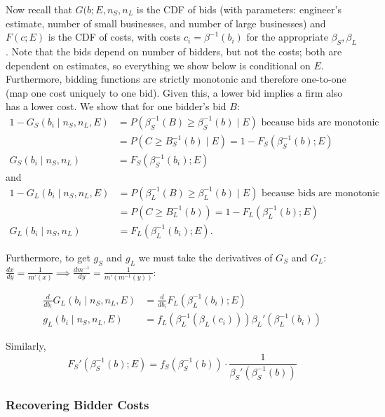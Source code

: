 Now recall that \(G(b; E, n_S, n_L\) is the CDF of bids (with parameters:
engineer's estimate, number of small businesses, and number of large businesses) and
\( F(c; E) \) is the CDF of costs, with costs \(c_i = \beta^{-1}(b_i)\) for the appropriate
\(\beta_S, \beta_L\). Note that the bids depend on number of bidders, but not the costs;
both are dependent on estimates, so everything we show below is conditional on \( E \).
Furthermore, bidding functions are strictly monotonic and therefore
one-to-one (map one cost uniquely to one bid).
Given this, a lower bid implies a firm also has a lower cost. We show that for one bidder's bid \(B\):
\[ \begin{aligned}
  1 - G_S(b_i \mid n_S, n_L, E) &= P(\beta_S^{-1}(B) \ge \beta_{S}^{-1}(b) \mid E) \text{ because bids are monotonic} \\
    &= P(C \ge B_{S}^{-1}(b) \mid E) = 1 - F_{S}(\beta_{S}^{-1}(b); E) \\
  G_S(b_i \mid n_S, n_L) &= F_S(\beta_S^{-1}(b_i); E)
\end{aligned} \]
and 
\[ \begin{aligned}
  1 - G_L(b_i \mid n_S, n_L, E) &= P(\beta_L^{-1}(B) \ge \beta_{L}^{-1}(b) \mid E) \text{ because bids are monotonic} \\
    &= P(C \ge B_{L}^{-1}(b)) = 1 - F_{L}(\beta_{L}^{-1}(b); E) \\
  G_L(b_i \mid n_S, n_L) &= F_L(\beta_L^{-1}(b_i); E).
\end{aligned} \]

Furthermore, to get $g_S$ and $g_L$ we must take the derivatives of $G_S$ and $G_L$:
\(\frac{dx}{dy} = \frac{1}{m'(x)} \implies \frac{dm^{-1}}{dy} = \frac{1}{m'(m^{-1}(y))}\):

\[ \begin{aligned}
  \frac{d}{db_i} G_L(b_i \mid n_S, n_L, E) &= \frac{d}{db_i} F_L(\beta_L^{-1}(b_i); E) \\
  g_L(b_i \mid n_S, n_L, E) &= f_L(\beta_L^{-1}(\beta_L(c_i))) \beta_L'(\beta_L^{-1}(b_i))
\end{aligned} \]

Similarly, 
\[
  F_{S}'(\beta_{S}^{-1}(b); E) = f_{S}(\beta_S^{-1}(b)) \cdot \frac{1}{\beta_S'(\beta_S^{-1}(b))}
\]

\subsubsection{Recovering Bidder Costs}


